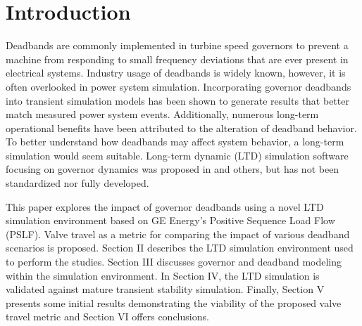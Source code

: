 \section{Introduction}
Deadbands are commonly implemented in turbine speed governors to prevent a machine from responding to small frequency deviations that are ever present in electrical systems.
Industry usage of deadbands is widely known, however, it is often overlooked in power system simulation.
Incorporating governor deadbands into transient simulation models has been shown to generate results that better match measured power system events\cite{kou2016}.
Additionally, numerous long-term operational benefits have been attributed to the alteration of deadband behavior\cite{nercFRI2012}.
To better understand how deadbands may affect system behavior, a long-term simulation would seem suitable.
Long-term dynamic (LTD) simulation software focusing on governor dynamics was proposed in \cite{AGCCresap} and others, but has not been standardized nor fully developed.


This paper explores the impact of governor deadbands using a novel LTD simulation environment based on GE Energy's Positive Sequence Load Flow (PSLF). 
Valve travel as a metric for comparing the impact of various deadband scenarios is proposed. 
Section II describes the LTD simulation environment used to perform the studies. 
Section III discusses governor and deadband modeling within the simulation environment. 
In Section IV, the LTD simulation is validated against mature transient stability simulation. 
Finally, Section V presents some initial results demonstrating the viability of the proposed valve travel metric and Section VI offers conclusions.
